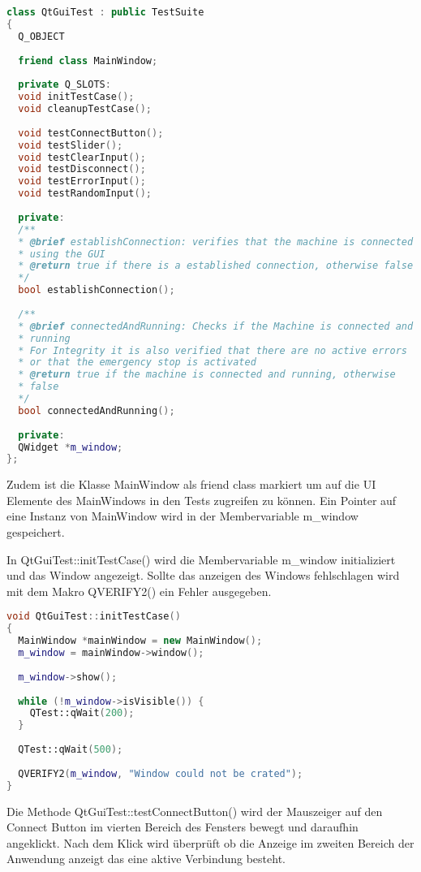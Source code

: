		\begin{lstlisting}[language=C++]		
class QtGuiTest : public TestSuite
{
  Q_OBJECT
	
  friend class MainWindow;
	
  private Q_SLOTS:
  void initTestCase();
  void cleanupTestCase();
	
  void testConnectButton();
  void testSlider();
  void testClearInput();
  void testDisconnect();
  void testErrorInput();
  void testRandomInput();
	
  private:
  /**
  * @brief establishConnection: verifies that the machine is connected
  * using the GUI
  * @return true if there is a established connection, otherwise false
  */
  bool establishConnection();
	
  /**
  * @brief connectedAndRunning: Checks if the Machine is connected and
  * running
  * For Integrity it is also verified that there are no active errors
  * or that the emergency stop is activated
  * @return true if the machine is connected and running, otherwise
  * false
  */
  bool connectedAndRunning();
	
  private:
  QWidget *m_window;
};
		\end{lstlisting}
	
		Zudem ist die Klasse MainWindow als friend class markiert um auf die UI Elemente des MainWindows in den Tests zugreifen zu können. Ein Pointer auf eine Instanz von MainWindow wird in der Membervariable m\_window gespeichert.
		
		In QtGuiTest::initTestCase() wird die Membervariable m\_window initializiert und das Window angezeigt. Sollte das anzeigen des Windows fehlschlagen wird mit dem Makro QVERIFY2() ein Fehler ausgegeben.
		
		\begin{lstlisting}[language=C++]	
void QtGuiTest::initTestCase()
{
  MainWindow *mainWindow = new MainWindow();
  m_window = mainWindow->window();
	
  m_window->show();
	
  while (!m_window->isVisible()) {
    QTest::qWait(200);
  }
	
  QTest::qWait(500);
	
  QVERIFY2(m_window, "Window could not be crated");
}		
		\end{lstlisting}
		Die Methode QtGuiTest::testConnectButton() wird der Mauszeiger auf den Connect Button im vierten Bereich des Fensters bewegt und daraufhin angeklickt. Nach dem Klick wird überprüft ob die Anzeige im zweiten Bereich der Anwendung anzeigt das eine aktive Verbindung besteht.
	
